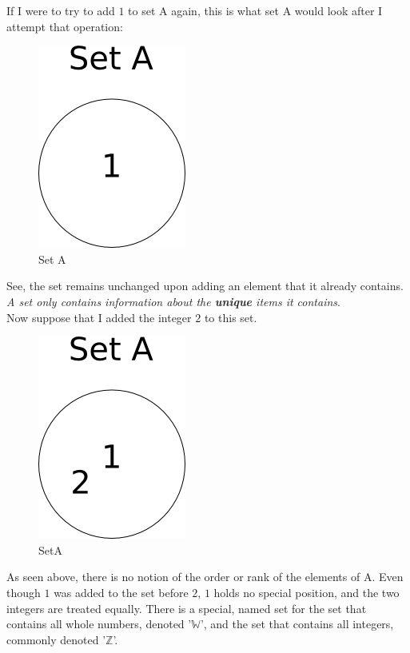 If I were to try to add $1$ to set A again, this is what set A would look after I attempt that operation:

\begin{center}
\begin{figure}
\caption{Set A} \label{fig:setA1_0}
\includegraphics[scale=0.5]{figures/setA1.png}
\end{figure}
\end{center}

See, the set remains unchanged upon adding an element that it already contains. \emph{A set only contains information about the \textbf{unique} items it contains}. \\
Now suppose that I added the integer $2$ to this set.

\begin{center}
\begin{figure}
\caption{SetA} \label{fig:setA12}
\includegraphics[scale=0.5]{figures/setA12.png}
\end{figure}
\end{center}

As seen above, there is no notion of the order or rank of the elements of A. Even though $1$ was added to the set before $2$, $1$ holds no special position, and the two integers are treated equally. There is a special, named set for the set that contains all whole numbers, denoted '$\mathbb{W}$', and the set that contains all integers, commonly denoted '$\mathbb{Z}$'.

